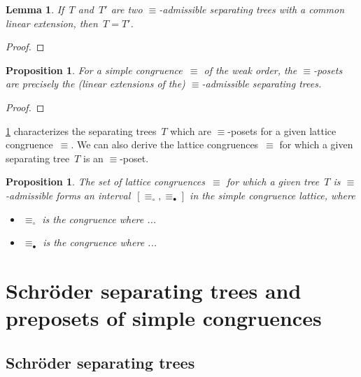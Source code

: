 \documentclass{amsart}
\newtheorem{proposition}[theorem]{Proposition}
\newtheorem{lemma}[theorem]{Lemma}
\theoremstyle{definition}
\newcommand{\vincent}[1]{\todo[color=blue!30]{#1 \\ \hfill --- V.}}
\begin{document}
\begin{lemma}
If~$T$ and~$T'$ are two $\equiv$-admissible separating trees with a common linear extension, then~${T = T'}$.
\end{lemma}

\begin{proof}
\vincent{todo}
\end{proof}

\begin{proposition}
\label{prop:admissibleSeparatingTrees}
For a simple congruence~$\equiv$ of the weak order, the $\equiv$-posets are precisely the (linear extensions of the) $\equiv$-admissible separating trees.
\end{proposition}

\begin{proof}
\vincent{todo}
\end{proof}


\cref{prop:admissibleSeparatingTrees} characterizes the separating trees~$T$ which are $\equiv$-posets for a given lattice congruence~$\equiv$.
We can also derive the lattice congruences~$\equiv$ for which a given separating tree~$T$ is an $\equiv$-poset.

\begin{proposition}
\label{prop:whichCongruences}
The set of lattice congruences~$\equiv$ for which a given tree~$T$ is $\equiv$-admissible forms an interval~$[\equiv_\circ, \equiv_\bullet]$ in the simple congruence lattice, where
\begin{itemize}
\item $\equiv_\circ$ is the congruence where ...
\item $\equiv_\bullet$ is the congruence where ...
\end{itemize}
\vincent{todo}
\end{proposition}



\section{Schröder separating trees and preposets of simple congruences}
\label{sec:SchroderSeparatingTreesPreposetsSimpleCongruences}


\subsection{Schröder separating trees}
\label{subsec:SchroderSeparatingTrees}
\end{document}
